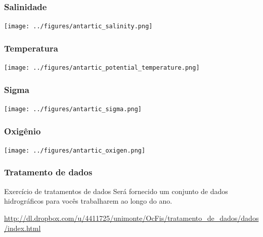 \begin{frame}
\frametitle{Salinidade}
    \begin{center}
      \texttt{[image: ../figures/antartic\_salinity.png]}
    \end{center}
\end{frame}


\begin{frame}
\frametitle{Temperatura}
    \begin{center}
      \texttt{[image: ../figures/antartic\_potential\_temperature.png]}
    \end{center}
\end{frame}


\begin{frame}
\frametitle{Sigma}
    \begin{center}
      \texttt{[image: ../figures/antartic\_sigma.png]}
    \end{center}
\end{frame}


\begin{frame}
\frametitle{Oxigênio}
    \begin{center}
      \texttt{[image: ../figures/antartic\_oxigen.png]}
    \end{center}
\end{frame}


\begin{frame}
\frametitle{Tratamento de dados}
  \begin{block}{Exercício de tratamentos de dados}
    Será fornecido um conjunto de dados hidrográficos para vocês
    trabalharem ao longo do ano.
  \end{block}

  \url{http://dl.dropbox.com/u/4411725/unimonte/OcFis/tratamento_de_dados/dados/index.html}
\end{frame}



